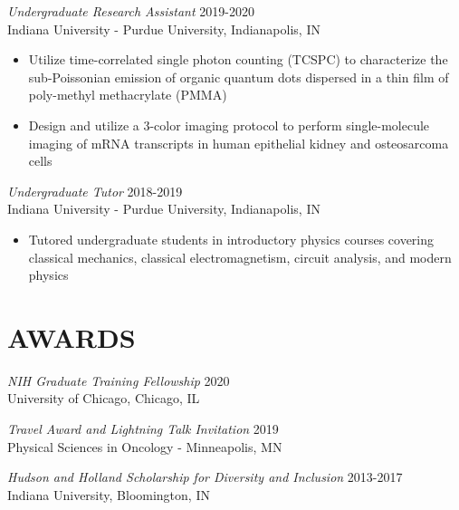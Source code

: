 \documentclass[margin, 10pt]{res} %
\begin{document}
\begin{resume}
\begin{itemize}
\end{itemize}
 
{\sl Undergraduate Research Assistant} \hfill 2019-2020\\
Indiana University - Purdue University, Indianapolis, IN
\begin{itemize} \itemsep -2pt %

\item Utilize time-correlated single photon counting (TCSPC) to characterize the sub-Poissonian emission of organic quantum dots dispersed in a thin film of poly-methyl methacrylate (PMMA)

\item Design and utilize a 3-color imaging protocol to perform single-molecule imaging of mRNA transcripts in human epithelial kidney and osteosarcoma cells 

\end{itemize} 


{\sl Undergraduate Tutor} \hfill 2018-2019\\
Indiana University - Purdue University, Indianapolis, IN
\begin{itemize} \itemsep -2pt %

\item Tutored undergraduate students in introductory physics courses covering classical mechanics, classical electromagnetism, circuit analysis, and modern physics

\end{itemize} 



\section{AWARDS}

{\sl NIH Graduate Training Fellowship} \hfill 2020 \\
University of Chicago, Chicago, IL

{\sl Travel Award and Lightning Talk Invitation} \hfill 2019 \\
Physical Sciences in Oncology - Minneapolis, MN

{\sl Hudson and Holland Scholarship for Diversity and Inclusion} \hfill 2013-2017 \\
Indiana University, Bloomington, IN 


\end{resume}
\end{document}
